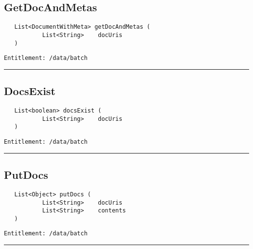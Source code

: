 \subsection{GetDocAndMetas}
\label{Api:GetDocAndMetas}
\begin{verbatim}
   List<DocumentWithMeta> getDocAndMetas (
           List<String>    docUris
   )
\end{verbatim}
\begin{Verbatim}[fontsize=\small, formatcom=\color{Maroon}]
  Entitlement: /data/batch
\end{Verbatim}



\rule{12cm}{2pt}
\subsection{DocsExist}
\label{Api:DocsExist}
\begin{verbatim}
   List<boolean> docsExist (
           List<String>    docUris
   )
\end{verbatim}
\begin{Verbatim}[fontsize=\small, formatcom=\color{Maroon}]
  Entitlement: /data/batch
\end{Verbatim}



\rule{12cm}{2pt}
\subsection{PutDocs}
\label{Api:PutDocs}
\begin{verbatim}
   List<Object> putDocs (
           List<String>    docUris
           List<String>    contents
   )
\end{verbatim}
\begin{Verbatim}[fontsize=\small, formatcom=\color{Maroon}]
  Entitlement: /data/batch
\end{Verbatim}



\rule{12cm}{2pt}
